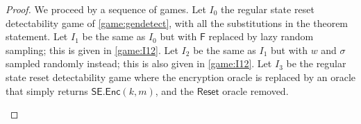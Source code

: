 \begin{proof}
We proceed by a sequence of games. Let $I_0$ the regular state reset detectability game of \autoref{game:gendetect}, with all the substitutions in the theorem statement. Let $I_1$ be the same as $I_0$ but with $\mathsf{F}$ replaced by lazy random sampling; this is given in \autoref{game:I12}. Let $I_2$ be the same as $I_1$ but with $w$ and $\sigma$ sampled randomly instead; this is also given in \autoref{game:I12}. Let $I_3$ be the regular state reset detectability game where the encryption oracle is replaced by an oracle that simply returns $\mathsf{SE.Enc}(k,m)$, and the $\mathsf{Reset}$ oracle removed.

\begin{figure}
\centering
\begin{pchstack}
\begin{pcvstack}
\pcvspace
{}
\pcvspace
{}
\end{pcvstack}
\pchspace
{}
\end{pchstack}
\end{figure}
\end{proof}
